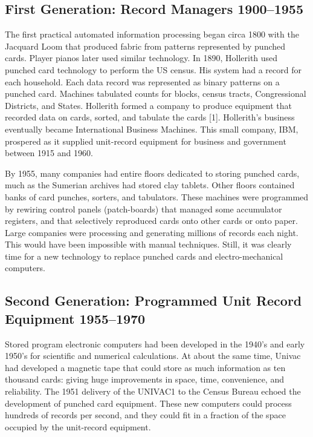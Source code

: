 \documentclass[a4paper,12pt,notitlepage,twoside,openright]{article}
\begin{document}
\hypertarget{first-generation-record-managers-1900--1955}{%
\subsection{First Generation: Record Managers 1900--1955}\label{first-generation-record-managers-1900--1955}}

The first practical automated information processing began circa 1800
with the Jacquard Loom that produced fabric from patterns represented by
punched cards. Player pianos later used similar technology. In 1890,
Hollerith used punched card technology to perform the US census. His
system had a record for each household. Each data record was represented
as binary patterns on a punched card. Machines tabulated counts for
blocks, census tracts, Congressional Districts, and States. Hollerith
formed a company to produce equipment that recorded data on cards,
sorted, and tabulate the cards {[}1{]}. Hollerith's business eventually
became International Business Machines. This small company, IBM,
prospered as it supplied unit-record equipment for business and
government between 1915 and 1960.

By 1955, many companies had entire floors dedicated to storing punched
cards, much as the Sumerian archives had stored clay tablets. Other
floors contained banks of card punches, sorters, and tabulators. These
machines were programmed by rewiring control panels (patch-boards) that
managed some accumulator registers, and that selectively reproduced
cards onto other cards or onto paper. Large companies were processing
and generating millions of records each night. This would have been
impossible with manual techniques. Still, it was clearly time for a new
technology to replace punched cards and electro-mechanical computers.

\hypertarget{second-generation-programmed-unit-record-equipment-1955--1970}{%
\subsection{Second Generation: Programmed Unit Record Equipment 1955--1970}\label{second-generation-programmed-unit-record-equipment-1955-1970}}

Stored program electronic computers had been developed in the 1940's and
early 1950's for scientific and numerical calculations. At about the
same time, Univac had developed a magnetic tape that could store as much
information as ten thousand cards: giving huge improvements in space,
time, convenience, and reliability. The 1951 delivery of the UNIVAC1 to
the Census Bureau echoed the development of punched card equipment.
These new computers could process hundreds of records per second, and
they could fit in a fraction of the space occupied by the unit-record
equipment.
\end{document}
